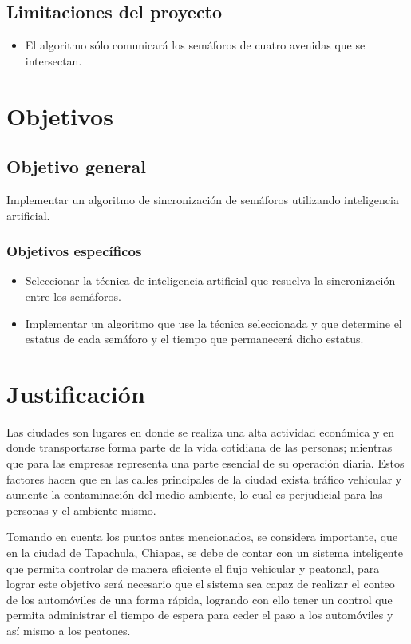 \subsection*{Limitaciones del proyecto}
\begin{itemize}
\item El algoritmo sólo comunicará los semáforos de cuatro avenidas que se intersectan.
\end{itemize}

\section{Objetivos}

\subsection*{Objetivo general}
Implementar un algoritmo de sincronización de semáforos utilizando inteligencia artificial.

\subsubsection*{Objetivos específicos}
\begin{itemize}
\item Seleccionar la técnica de inteligencia artificial que resuelva la sincronización entre los semáforos.
\item Implementar un algoritmo que use la técnica seleccionada y que determine el estatus de cada semáforo y el tiempo que permanecerá dicho estatus.
\end{itemize}

\section{Justificación}
Las ciudades son lugares en donde se realiza una alta actividad económica y en donde transportarse forma parte de la vida cotidiana de las personas; mientras que para las empresas representa una parte esencial de su operación diaria. Estos factores hacen que en las calles principales de la ciudad exista tráfico vehicular y aumente la contaminación del medio ambiente, lo cual es perjudicial para las personas y el ambiente mismo.

Tomando en cuenta los puntos antes mencionados, se considera importante, que en la ciudad de Tapachula, Chiapas, se debe de contar con un sistema inteligente que permita controlar de manera eficiente el flujo vehicular y peatonal, para lograr este objetivo será necesario que el sistema sea capaz de realizar el conteo de los automóviles de una forma rápida, logrando con ello tener un control que permita administrar el tiempo de espera para ceder el paso a los automóviles y así mismo a los peatones.

